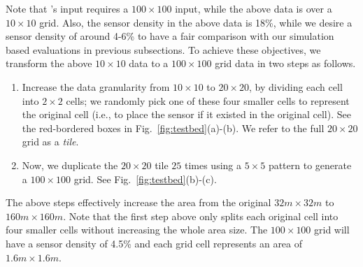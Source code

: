 Note that \our's input requires a $100\times 100$ input, while the above data is over a
 $10\times 10$ grid. Also, the sensor density in the above data is 18\%, while we desire a sensor
 density of around 4-6\% to have a fair comparison with our simulation based evaluations in previous subsections. To achieve these objectives, we transform the above $10 \times 10$ data to a $100 \times 100$ grid data in two steps as follows.
\begin{enumerate}
    \item Increase the data granularity from $10 \times 10$ to $20\times 20$, by dividing each cell into $2 \times 2$ cells; we randomly pick one of these four smaller cells to represent the original cell (i.e., to place the sensor if it existed in the original cell). See the red-bordered boxes in Fig.~\ref{fig:testbed}(a)-(b). We refer to the full $20 \times 20$ grid as a \emph{tile}.
    \item Now, we duplicate the $20\times20$ tile $25$ times using a $5 \times 5$ pattern to generate a  $100 \times 100$ grid. See Fig.~\ref{fig:testbed}(b)-(c).
\end{enumerate}
The above steps effectively increase the area from the original $32m\times32m$ to $160m\times160m$. 
Note that the first step above only splits each original cell into four smaller cells without increasing the whole area size.
The $100\times100$ grid will have a sensor density of 4.5\% and each grid cell represents an area of $1.6m\times1.6m$.





